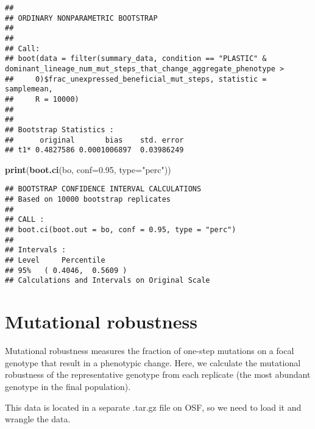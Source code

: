 \documentclass[]{book}
\newenvironment{Shaded}{\begin{snugshade}}{\end{snugshade}}
\newcommand{\DataTypeTok}[1]{\textcolor[rgb]{0.13,0.29,0.53}{#1}}
\newcommand{\FloatTok}[1]{\textcolor[rgb]{0.00,0.00,0.81}{#1}}
\newcommand{\KeywordTok}[1]{\textcolor[rgb]{0.13,0.29,0.53}{\textbf{#1}}}
\newcommand{\NormalTok}[1]{#1}
\newcommand{\StringTok}[1]{\textcolor[rgb]{0.31,0.60,0.02}{#1}}
\begin{document}
\begin{verbatim}
## 
## ORDINARY NONPARAMETRIC BOOTSTRAP
## 
## 
## Call:
## boot(data = filter(summary_data, condition == "PLASTIC" & dominant_lineage_num_mut_steps_that_change_aggregate_phenotype > 
##     0)$frac_unexpressed_beneficial_mut_steps, statistic = samplemean, 
##     R = 10000)
## 
## 
## Bootstrap Statistics :
##      original       bias    std. error
## t1* 0.4827586 0.0001006897  0.03986249
\end{verbatim}

\begin{Shaded}
\begin{Highlighting}[]
\KeywordTok{print}\NormalTok{(}\KeywordTok{boot.ci}\NormalTok{(bo, }\DataTypeTok{conf=}\FloatTok{0.95}\NormalTok{, }\DataTypeTok{type=}\StringTok{"perc"}\NormalTok{))}
\end{Highlighting}
\end{Shaded}

\begin{verbatim}
## BOOTSTRAP CONFIDENCE INTERVAL CALCULATIONS
## Based on 10000 bootstrap replicates
## 
## CALL : 
## boot.ci(boot.out = bo, conf = 0.95, type = "perc")
## 
## Intervals : 
## Level     Percentile     
## 95%   ( 0.4046,  0.5609 )  
## Calculations and Intervals on Original Scale
\end{verbatim}

\hypertarget{mutational-robustness}{%
\section{Mutational robustness}\label{mutational-robustness}}

Mutational robustness measures the fraction of one-step mutations on a focal genotype that result in a phenotypic change.
Here, we calculate the mutational robustness of the representative genotype from each replicate (the most abundant genotype in the final population).

This data is located in a separate .tar.gz file on OSF, so we need to load it and wrangle the data.
\end{document}
